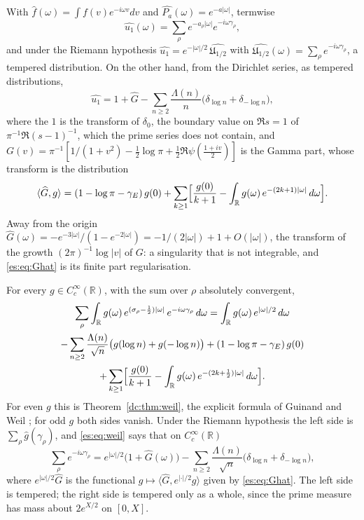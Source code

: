 With $\widehat f(\omega)=\int f(v)e^{-i\omega v}dv$ and $\widehat{P_a}(\omega)=e^{-a|\omega|}$, termwise
\begin{equation}\label{es:eq:u1hat}
\widehat{u_1}(\omega)=\sum_\rho e^{-a_\rho|\omega|}e^{-i\omega\gamma_\rho},
\end{equation}
and under the Riemann hypothesis $\widehat{u_1}=e^{-|\omega|/2}\,\widehat{\mathfrak U_{1/2}}$ with $\widehat{\mathfrak U_{1/2}}(\omega)=\sum_\rho e^{-i\omega\gamma_\rho}$, a tempered distribution. On the other hand, from the Dirichlet series, as tempered distributions,
\begin{equation}\label{es:eq:spectrum}
\widehat{u_1}=1+\widehat G-\sum_{n\ge2}\frac{\Lambda(n)}n\bigl(\delta_{\log n}+\delta_{-\log n}\bigr),
\end{equation}
where the $1$ is the transform of $\delta_0$, the boundary value on $\Re s=1$ of $\pi^{-1}\Re(s-1)^{-1}$, which the prime series does not contain, and $G(v)=\pi^{-1}[1/(1+v^2)-\tfrac12\log\pi+\tfrac12\Re\psi(\tfrac{1+iv}2)]$ is the Gamma part, whose transform is the distribution
\begin{equation}\label{es:eq:Ghat}
\langle\widehat G,g\rangle=(1-\log\pi-\gamma_E)\,g(0)+\sum_{k\ge1}\Bigl[\frac{g(0)}{k+1}-\int_{\mathbb R}g(\omega)\,e^{-(2k+1)|\omega|}\,d\omega\Bigr].
\end{equation}
Away from the origin $\widehat G(\omega)=-e^{-3|\omega|}/(1-e^{-2|\omega|})=-1/(2|\omega|)+1+O(|\omega|)$, the transform of the growth $(2\pi)^{-1}\log|v|$ of $G$: a singularity that is not integrable, and \eqref{es:eq:Ghat} is its finite part regularisation.

\begin{theorem}\label{es:thm:explicit}
For every $g\in C_c^\infty(\mathbb R)$, with the sum over $\rho$ absolutely convergent,
\begin{multline}\label{es:eq:weil}
\sum_\rho\int_{\mathbb R}g(\omega)\,e^{(\sigma_\rho-\frac12)|\omega|}\,e^{-i\omega\gamma_\rho}\,d\omega=\int_{\mathbb R}g(\omega)\,e^{|\omega|/2}\,d\omega\\
-\sum_{n\ge2}\frac{\Lambda(n)}{\sqrt n}\bigl(g(\log n)+g(-\log n)\bigr)+(1-\log\pi-\gamma_E)\,g(0)\\
+\sum_{k\ge1}\Bigl[\frac{g(0)}{k+1}-\int_{\mathbb R}g(\omega)\,e^{-(2k+\frac12)|\omega|}\,d\omega\Bigr].
\end{multline}
For even $g$ this is Theorem~\ref{dc:thm:weil}, the explicit formula of Guinand \cite{Guinand48} and Weil \cite{Weil52}; for odd $g$ both sides vanish. Under the Riemann hypothesis the left side is $\sum_\rho\widehat g(\gamma_\rho)$, and \eqref{es:eq:weil} says that on $C_c^\infty(\mathbb R)$
\[
\sum_\rho e^{-i\omega\gamma_\rho}=e^{|\omega|/2}\bigl(1+\widehat G(\omega)\bigr)-\sum_{n\ge2}\frac{\Lambda(n)}{\sqrt n}\bigl(\delta_{\log n}+\delta_{-\log n}\bigr),
\]
where $e^{|\omega|/2}\widehat G$ is the functional $g\mapsto\langle\widehat G,e^{|\cdot|/2}g\rangle$ given by \eqref{es:eq:Ghat}. The left side is tempered; the right side is tempered only as a whole, since the prime measure has mass about $2e^{X/2}$ on $[0,X]$.
\end{theorem}

